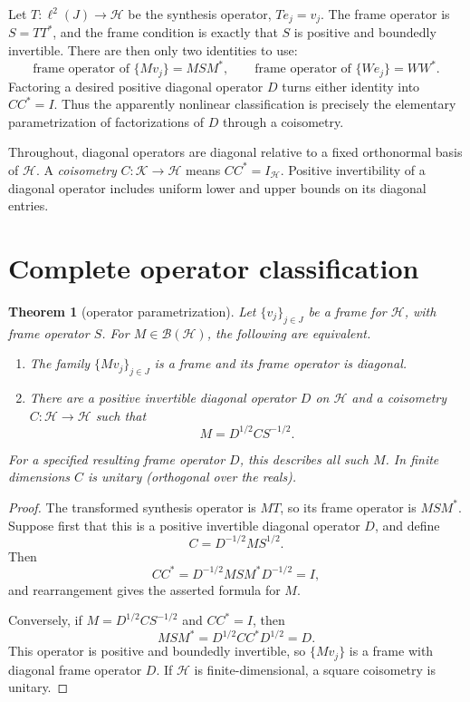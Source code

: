 \documentclass[11pt]{article}
\newtheorem{theorem}{Theorem}
\newcommand{\HH}{\mathcal H}
\newcommand{\ellJ}{\ell^2(J)}
\begin{document}
Let \(T:\ellJ\to\HH\) be the synthesis operator, \(Te_j=v_j\). The frame
operator is \(S=TT^*\), and the frame condition is exactly that \(S\) is
positive and boundedly invertible. There are then only two identities to
use:
\[
 \text{frame operator of }\{Mv_j\}=MSM^*,
 \qquad
 \text{frame operator of }\{We_j\}=WW^*.
\]
Factoring a desired positive diagonal operator \(D\) turns either identity
into \(CC^*=I\). Thus the apparently nonlinear classification is precisely
the elementary parametrization of factorizations of \(D\) through a
coisometry.

Throughout, diagonal operators are diagonal relative to a fixed orthonormal
basis of \(\HH\). A \emph{coisometry} \(C:\mathcal K\to\HH\) means
\(CC^*=I_{\HH}\). Positive invertibility of a diagonal operator includes
uniform lower and upper bounds on its diagonal entries.

\section{Complete operator classification}

\begin{theorem}[operator parametrization]\label{thm:operator}
Let \(\{v_j\}_{j\in J}\) be a frame for \(\HH\), with frame operator \(S\).
For \(M\in\mathcal B(\HH)\), the following are equivalent.
\begin{enumerate}
\item The family \(\{Mv_j\}_{j\in J}\) is a frame and its frame operator is
diagonal.
\item There are a positive invertible diagonal operator \(D\) on \(\HH\)
and a coisometry \(C:\HH\to\HH\) such that
\[
 M=D^{1/2}CS^{-1/2}.
\]
\end{enumerate}
For a specified resulting frame operator \(D\), this describes all such
\(M\). In finite dimensions \(C\) is unitary (orthogonal over the reals).
\end{theorem}

\begin{proof}
The transformed synthesis operator is \(MT\), so its frame operator is
\(MSM^*\). Suppose first that this is a positive invertible diagonal
operator \(D\), and define
\[
 C=D^{-1/2}MS^{1/2}.
\]
Then
\[
 CC^*=D^{-1/2}MSM^*D^{-1/2}=I,
\]
and rearrangement gives the asserted formula for \(M\).

Conversely, if \(M=D^{1/2}CS^{-1/2}\) and \(CC^*=I\), then
\[
 MSM^*=D^{1/2}CC^*D^{1/2}=D.
\]
This operator is positive and boundedly invertible, so \(\{Mv_j\}\) is a
frame with diagonal frame operator \(D\). If \(\HH\) is finite-dimensional,
a square coisometry is unitary.
\end{proof}
\end{document}
